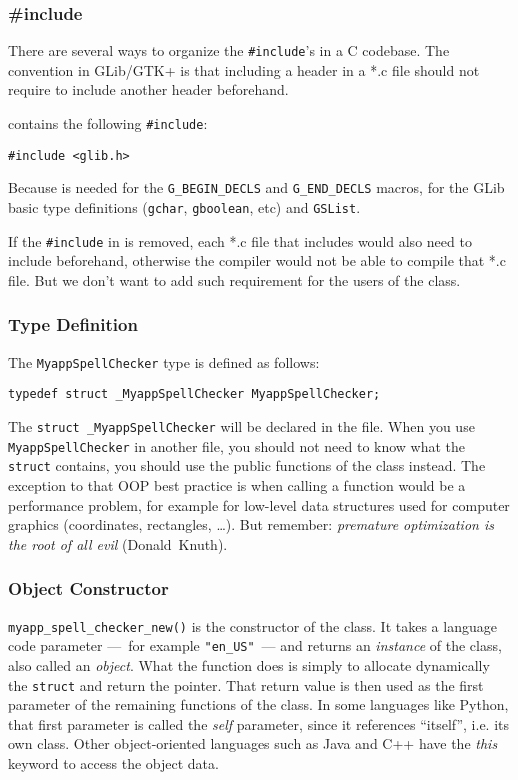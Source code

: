\subsubsection{\#include}
\label{oop-include-in-header}
There are several ways to organize the \lstinline{#include}'s in a C codebase. The convention in GLib/GTK+ is that including a header in a *.c file should not require to include another header beforehand.

 contains the following \lstinline{#include}:
\begin{lstlisting}
#include <glib.h>
\end{lstlisting}

Because  is needed for the \lstinline{G_BEGIN_DECLS} and \lstinline{G_END_DECLS} macros, for the GLib basic type definitions (\lstinline{gchar}, \lstinline{gboolean}, etc) and \lstinline{GSList}.

If the \lstinline{#include} in  is removed, each *.c file that includes  would also need to include  beforehand, otherwise the compiler would not be able to compile that *.c file. But we don't want to add such requirement for the users of the class.

\subsubsection{Type Definition}
The \lstinline{MyappSpellChecker} type is defined as follows:

\begin{lstlisting}
typedef struct _MyappSpellChecker MyappSpellChecker;
\end{lstlisting}

The \lstinline{struct _MyappSpellChecker} will be declared in the  file. When you use \lstinline{MyappSpellChecker} in another file, you should not need to know what the \lstinline{struct} contains, you should use the public functions of the class instead. The exception to that OOP best practice is when calling a function would be a performance problem, for example for low-level data structures used for computer graphics (coordinates, rectangles, …). But remember: \emph{premature optimization is the root of all evil} (Donald~Knuth).

\subsubsection{Object Constructor}
\lstinline{myapp_spell_checker_new()} is the constructor of the class. It takes a language code parameter ---~for example \lstinline{"en_US"}~--- and returns an \emph{instance} of the class, also called an \emph{object}. What the function does is simply to allocate dynamically the \lstinline{struct} and return the pointer. That return value is then used as the first parameter of the remaining functions of the class. In some languages like Python, that first parameter is called the \emph{self} parameter, since it references ``itself'', i.e. its own class. Other object-oriented languages such as Java and C++ have the \emph{this} keyword to access the object data.

